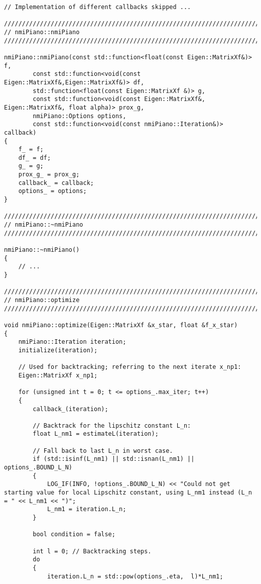 \documentclass[11pt]{article}
\begin{document}
\begin{lstlisting}
// Implementation of different callbacks skipped ...

////////////////////////////////////////////////////////////////////////////////
// nmiPiano::nmiPiano
////////////////////////////////////////////////////////////////////////////////

nmiPiano::nmiPiano(const std::function<float(const Eigen::MatrixXf&)> f, 
        const std::function<void(const Eigen::MatrixXf&,Eigen::MatrixXf&)> df, 
        std::function<float(const Eigen::MatrixXf &)> g,
        const std::function<void(const Eigen::MatrixXf&, Eigen::MatrixXf&, float alpha)> prox_g,
        nmiPiano::Options options,
        const std::function<void(const nmiPiano::Iteration&)> callback)
{
    f_ = f;
    df_ = df;
    g_ = g;
    prox_g_ = prox_g;
    callback_ = callback;
    options_ = options;
}

////////////////////////////////////////////////////////////////////////////////
// nmiPiano::~nmiPiano
////////////////////////////////////////////////////////////////////////////////

nmiPiano::~nmiPiano()
{
    // ...
}

////////////////////////////////////////////////////////////////////////////////
// nmiPiano::optimize
////////////////////////////////////////////////////////////////////////////////

void nmiPiano::optimize(Eigen::MatrixXf &x_star, float &f_x_star)
{
    nmiPiano::Iteration iteration;
    initialize(iteration);
    
    // Used for backtracking; referring to the next iterate x_np1:
    Eigen::MatrixXf x_np1;
    
    for (unsigned int t = 0; t <= options_.max_iter; t++)
    {
        callback_(iteration);
        
        // Backtrack for the lipschitz constant L_n:
        float L_nm1 = estimateL(iteration);
        
        // Fall back to last L_n in worst case.
        if (std::isinf(L_nm1) || std::isnan(L_nm1) || options_.BOUND_L_N)
        {
            LOG_IF(INFO, !options_.BOUND_L_N) << "Could not get starting value for local Lipschitz constant, using L_nm1 instead (L_n = " << L_nm1 << ")";
            L_nm1 = iteration.L_n;
        }
        
        bool condition = false;
        
        int l = 0; // Backtracking steps.
        do
        {
            iteration.L_n = std::pow(options_.eta,  l)*L_nm1;
            

\end{lstlisting}
\end{document}
